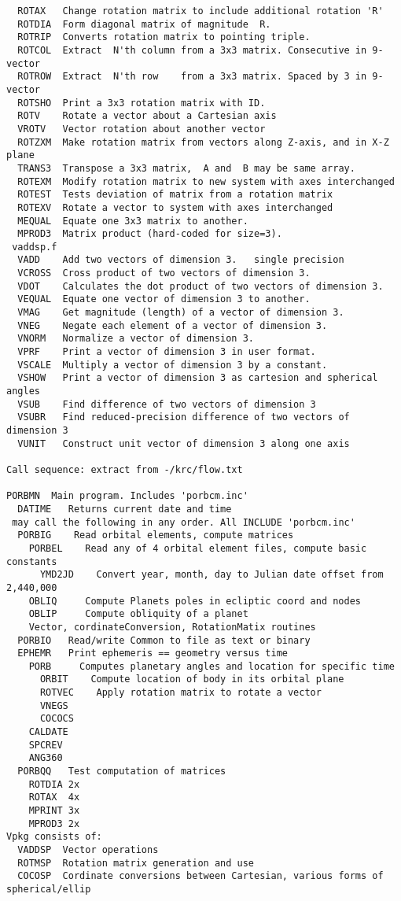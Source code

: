 \documentclass[draft]{article}
\begin{document}
\begin{verbatim}
  ROTAX   Change rotation matrix to include additional rotation 'R'
  ROTDIA  Form diagonal matrix of magnitude  R.
  ROTRIP  Converts rotation matrix to pointing triple.
  ROTCOL  Extract  N'th column from a 3x3 matrix. Consecutive in 9-vector
  ROTROW  Extract  N'th row    from a 3x3 matrix. Spaced by 3 in 9-vector
  ROTSHO  Print a 3x3 rotation matrix with ID. 
  ROTV    Rotate a vector about a Cartesian axis
  VROTV   Vector rotation about another vector
  ROTZXM  Make rotation matrix from vectors along Z-axis, and in X-Z plane
  TRANS3  Transpose a 3x3 matrix,  A and  B may be same array.
  ROTEXM  Modify rotation matrix to new system with axes interchanged
  ROTEST  Tests deviation of matrix from a rotation matrix
  ROTEXV  Rotate a vector to system with axes interchanged
  MEQUAL  Equate one 3x3 matrix to another.
  MPROD3  Matrix product (hard-coded for size=3).
 vaddsp.f
  VADD    Add two vectors of dimension 3.   single precision
  VCROSS  Cross product of two vectors of dimension 3.
  VDOT    Calculates the dot product of two vectors of dimension 3.
  VEQUAL  Equate one vector of dimension 3 to another.
  VMAG    Get magnitude (length) of a vector of dimension 3.
  VNEG    Negate each element of a vector of dimension 3.
  VNORM   Normalize a vector of dimension 3.
  VPRF    Print a vector of dimension 3 in user format.
  VSCALE  Multiply a vector of dimension 3 by a constant.
  VSHOW   Print a vector of dimension 3 as cartesion and spherical angles
  VSUB    Find difference of two vectors of dimension 3
  VSUBR   Find reduced-precision difference of two vectors of dimension 3
  VUNIT   Construct unit vector of dimension 3 along one axis 

Call sequence: extract from -/krc/flow.txt

PORBMN  Main program. Includes 'porbcm.inc'
  DATIME   Returns current date and time
 may call the following in any order. All INCLUDE 'porbcm.inc'
  PORBIG    Read orbital elements, compute matrices
    PORBEL    Read any of 4 orbital element files, compute basic constants
      YMD2JD    Convert year, month, day to Julian date offset from 2,440,000
    OBLIQ     Compute Planets poles in ecliptic coord and nodes
    OBLIP     Compute obliquity of a planet  
    Vector, cordinateConversion, RotationMatix routines
  PORBIO   Read/write Common to file as text or binary
  EPHEMR   Print ephemeris == geometry versus time
    PORB     Computes planetary angles and location for specific time
      ORBIT    Compute location of body in its orbital plane
      ROTVEC    Apply rotation matrix to rotate a vector
      VNEGS
      COCOCS
    CALDATE
    SPCREV
    ANG360
  PORBQQ   Test computation of matrices
    ROTDIA 2x
    ROTAX  4x
    MPRINT 3x
    MPROD3 2x 
Vpkg consists of:
  VADDSP  Vector operations
  ROTMSP  Rotation matrix generation and use
  COCOSP  Cordinate conversions between Cartesian, various forms of spherical/ellip


\end{verbatim}
\end{document}
